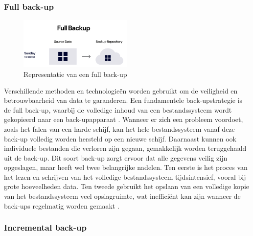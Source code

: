\subsubsection{Full back-up}%
\begin{figure}[h] 
    \includegraphics[width=0.5\textwidth]{img/fullb.png}  
    \caption{Representatie van een full back-up \autocite{Rivas2022}}   
    \label{fig:fullback-up}           
\end{figure}
Verschillende methoden en technologieën worden gebruikt om de veiligheid en betrouwbaarheid van data te garanderen. Een fundamentele back-upstrategie is de full back-up, waarbij de volledige inhoud van een bestandssysteem wordt gekopieerd naar een back-upapparaat \autocite{Beard2018}. Wanneer er zich een probleem voordoet, zoals het falen van een harde schijf, kan het hele bestandssysteem vanaf deze back-up volledig worden hersteld op een nieuwe schijf. Daarnaast kunnen ook individuele bestanden die verloren zijn gegaan, gemakkelijk worden teruggehaald uit de back-up. Dit soort back-up zorgt ervoor dat alle gegevens veilig zijn opgeslagen, maar heeft wel twee belangrijke nadelen. Ten eerste is het proces van het lezen en schrijven van het volledige bestandssysteem tijdsintensief, vooral bij grote hoeveelheden data. Ten tweede gebruikt het opslaan van een volledige kopie van het bestandssysteem veel opslagruimte, wat inefficiënt kan zijn wanneer de back-ups regelmatig worden gemaakt \autocite{Chervenak1998}.


\subsubsection{Incremental back-up}

